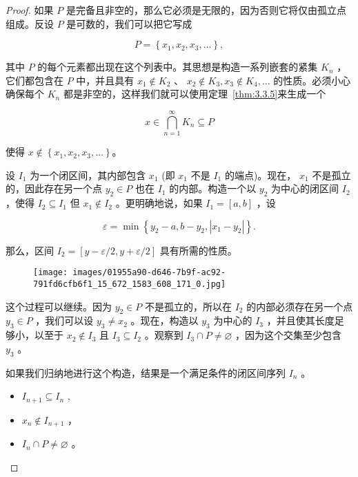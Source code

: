 \begin{proof}
如果 \(P\) 是完备且非空的，那么它必须是无限的，因为否则它将仅由孤立点组成。反设 \(P\) 是可数的，我们可以把它写成

\[
P = \left\{  {{x}_{1},{x}_{2},{x}_{3},\ldots }\right\}  ,
\]

其中 \(P\) 的每个元素都出现在这个列表中。其思想是构造一系列嵌套的紧集 \({K}_{n}\) ，它们都包含在 \(P\) 中，并且具有 \({x}_{1} \notin  {K}_{2}\) 、 \({x}_{2} \notin  {K}_{3},{x}_{3} \notin  {K}_{4},\ldots\) 的性质。必须小心确保每个 \({K}_{n}\) 都是非空的，这样我们就可以使用定理~\ref{thm:3.3.5}来生成一个

\[
x \in  \mathop{\bigcap }\limits_{{n = 1}}^{\infty }{K}_{n} \subseteq  P
\]

使得 \(x\not\in \left\{  {{x}_{1},{x}_{2},{x}_{3},\ldots }\right\}\)。

设 \({I}_{1}\) 为一个闭区间，其内部包含 \({x}_{1}\) (即 \({x}_{1}\) 不是 \({I}_{1}\) 的端点)。现在， \({x}_{1}\) 不是孤立的，因此存在另一个点 \({y}_{2} \in  P\) 也在 \({I}_{1}\) 的内部。构造一个以 \({y}_{2}\) 为中心的闭区间 \({I}_{2}\) ，使得 \({I}_{2} \subseteq  {I}_{1}\) 但 \({x}_{1} \notin  {I}_{2}\) 。更明确地说，如果 \({I}_{1} = \left\lbrack  {a,b}\right\rbrack\) ，设

\[
\varepsilon  = \min \left\{  {{y}_{2} - a,b - {y}_{2},\left| {{x}_{1} - {y}_{2}}\right| }\right\}  .
\]

那么，区间 \({I}_{2} = \left\lbrack  {y - \varepsilon /2,y + \varepsilon /2}\right\rbrack\) 具有所需的性质。

\begin{figure}[h]
  \centering
  \texttt{[image: images/01955a90-d646-7b9f-ac92-791fd6cfb6f1\_15\_672\_1583\_608\_171\_0.jpg]}
\end{figure}

这个过程可以继续。因为 \({y}_{2} \in  P\) 不是孤立的，所以在 \({I}_{2}\) 的内部必须存在另一个点 \({y}_{3} \in  P\) ，我们可以设 \({y}_{3} \neq  {x}_{2}\) 。现在，构造以 \({y}_{3}\) 为中心的 \({I}_{3}\) ，并且使其长度足够小，以至于 \({x}_{2} \notin  {I}_{3}\) 且 \({I}_{3} \subseteq  {I}_{2}\) 。观察到 \({I}_{3} \cap  P \neq  \varnothing\) ，因为这个交集至少包含 \({y}_{3}\) 。

如果我们归纳地进行这个构造，结果是一个满足条件的闭区间序列 \({I}_{n}\) 。
\begin{itemize}
\item \({I}_{n + 1} \subseteq  {I}_{n}\) ,
\item \({x}_{n} \notin  {I}_{n + 1}\) ，
\item \({I}_{n} \cap  P \neq  \varnothing\) 。
\end{itemize}


\end{proof}
